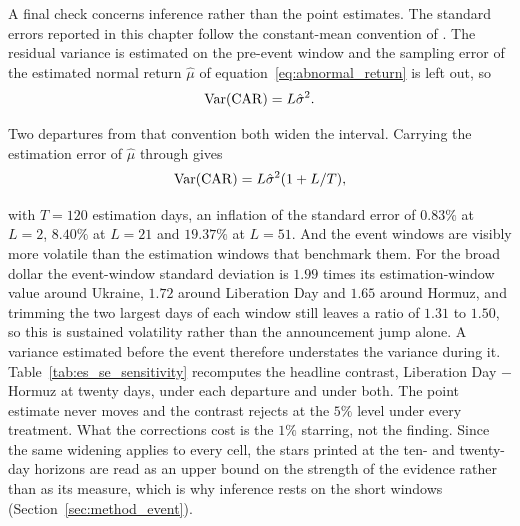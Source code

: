 A final check concerns inference rather than the point estimates. The standard errors
reported in this chapter follow the constant-mean convention of \textcite{mackinlay_1997}. The residual
variance is estimated on the pre-event window and the sampling error of the estimated normal
return $\hat\mu$ of equation~\eqref{eq:abnormal_return} is left out, so
\begin{equation*}
  \mathrm{Var}(\mathrm{CAR})=L\hat\sigma^2.
\end{equation*}
\begin{samepage}
Two departures from that convention both widen the interval. Carrying the estimation error
of $\hat\mu$ through gives
\begin{equation*}
  \mathrm{Var}(\mathrm{CAR})=L\hat\sigma^2(1+L/T),
\end{equation*}
\end{samepage}
with $T=120$ estimation days, an inflation of the
standard error of $0.83\%$ at $L=2$, $8.40\%$ at $L=21$ and $19.37\%$ at $L=51$. And the event
windows are visibly more volatile than the estimation windows that benchmark them. For the
broad dollar the event-window standard deviation is $1.99$ times its estimation-window value
around Ukraine, $1.72$ around Liberation Day and $1.65$ around Hormuz, and trimming the two
largest days of each window still leaves a ratio of $1.31$ to $1.50$, so this is sustained
volatility rather than the announcement jump alone. A variance estimated before the event
therefore understates the variance during it.
Table~\ref{tab:es_se_sensitivity} recomputes the headline contrast, Liberation Day $-$ Hormuz
at twenty days, under each departure and under both. The point estimate never moves and the
contrast rejects at the $5\%$ level under every treatment. What the corrections cost is the
$1\%$ starring, not the finding. Since the same widening applies to every cell, the stars
printed at the ten- and twenty-day horizons are read as an upper bound on the strength of the
evidence rather than as its measure, which is why inference rests on the short windows
(Section~\ref{sec:method_event}).



